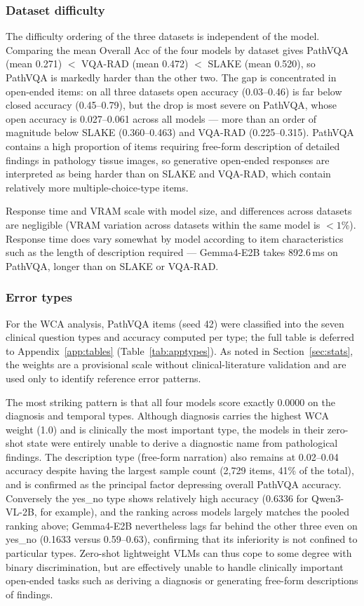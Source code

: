 \subsubsection{Dataset difficulty}

The difficulty ordering of the three datasets is independent of the model.
Comparing the mean Overall Acc of the four models by dataset gives PathVQA (mean
0.271) $<$ VQA-RAD (mean 0.472) $<$ SLAKE (mean 0.520), so PathVQA is markedly
harder than the other two. The gap is concentrated in open-ended items: on all
three datasets open accuracy (0.03--0.46) is far below closed accuracy
(0.45--0.79), but the drop is most severe on PathVQA, whose open accuracy is
0.027--0.061 across all models --- more than an order of magnitude below SLAKE
(0.360--0.463) and VQA-RAD (0.225--0.315). PathVQA contains a high proportion of
items requiring free-form description of detailed findings in pathology tissue
images, so generative open-ended responses are interpreted as being harder than
on SLAKE and VQA-RAD, which contain relatively more multiple-choice-type items.

Response time and VRAM scale with model size, and differences across datasets are
negligible (VRAM variation across datasets within the same model is $< 1\%$).
Response time does vary somewhat by model according to item characteristics such
as the length of description required --- Gemma4-E2B takes 892.6\,ms on PathVQA,
longer than on SLAKE or VQA-RAD.

\subsubsection{Error types}

For the WCA analysis, PathVQA items (seed 42) were classified into the seven
clinical question types and accuracy computed per type; the full table is
deferred to Appendix~\ref{app:tables} (Table~\ref{tab:apptypes}). As noted in
Section~\ref{sec:stats}, the weights are a provisional scale without
clinical-literature validation and are used only to identify reference error
patterns.

The most striking pattern is that all four models score exactly 0.0000 on the
diagnosis and temporal types. Although diagnosis carries the highest WCA weight
(1.0) and is clinically the most important type, the models in their zero-shot
state were entirely unable to derive a diagnostic name from pathological
findings. The description type (free-form narration) also remains at 0.02--0.04
accuracy despite having the largest sample count (2,729 items, 41\% of the
total), and is confirmed as the principal factor depressing overall PathVQA
accuracy. Conversely the yes\_no type shows relatively high accuracy (0.6336 for
Qwen3-VL-2B, for example), and the ranking across models largely matches the
pooled ranking above; Gemma4-E2B nevertheless lags far behind the other three
even on yes\_no (0.1633 versus 0.59--0.63), confirming that its inferiority is
not confined to particular types. Zero-shot lightweight VLMs can thus cope to
some degree with binary discrimination, but are effectively unable to handle
clinically important open-ended tasks such as deriving a diagnosis or generating
free-form descriptions of findings.

